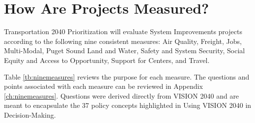 \documentclass[10pt, letterpaper, final, twoside, onecolumn]{memoir}%
\begin{document}
\section{How Are Projects Measured?}

Transportation 2040 Prioritization will evaluate System Improvements projects according to the following nine consistent measures: Air Quality, Freight, Jobs, Multi-Modal, Puget Sound Land and Water, Safety and System Security, Social Equity and Access to Opportunity, Support for Centers, and Travel.

Table \ref{tb:ninemeasures} reviews the purpose for each measure. The questions and points associated with each measure can be reviewed in Appendix \ref{ch:ninemeasures}. Questions were derived directly from VISION 2040 and are meant to encapsulate the 37 policy concepts highlighted in Using VISION 2040 in Decision-Making.
\end{document}
